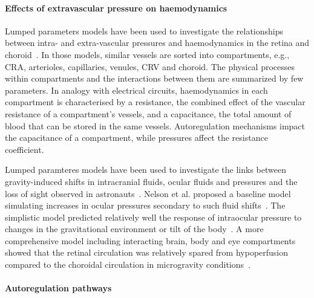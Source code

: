 \documentclass{article}
\begin{document}
\paragraph*{Effects of extravascular pressure on haemodynamics} %

Lumped parameters models have been used to investigate the relationships between intra- and extra-vascular pressures and haemodynamics in the retina and choroid~\cite{Chiaravalli_2021,Fawzi_2019,Guidoboni_2014a,Nelson_2017,Petersen_2022,Prudhomme_2021,Sala_2020,Salerni_2019}.
In those models, similar vessels are sorted into compartments, e.g., CRA, arterioles, capillaries, venules, CRV and choroid.
The physical processes within compartments and the interactions between them are summarized by few parameters.
In analogy with electrical circuits, haemodynamics in each compartment is characterised by a resistance, the combined effect of the vascular resistance of a compartment's vessels, and a capacitance, the total amount of blood that can be stored in the same vessels.
Autoregulation mechanisms impact the capacitance of a compartment, while pressures affect the resistance coefficient.

Lumped paramteres models have been used to investigate the links between gravity-induced shifts in intracranial fluids, ocular fluids and pressures and the loss of sight observed in astronauts~\cite{Nelson_2017,Petersen_2022,Salerni_2019}.
Nelson et al. proposed a baseline model simulating increases in ocular pressures secondary to such fluid shifts~\cite{Nelson_2017}.
The simplistic model predicted relatively well the response of intraocular pressure to changes in the gravitational environment or tilt of the body~\cite{Nelson_2017,Petersen_2022}.
A more comprehensive model including interacting brain, body and eye compartments showed that the retinal circulation was relatively spared from hypoperfusion compared to the choroidal circulation in microgravity conditions~\cite{Salerni_2019}.


\paragraph*{Autoregulation pathways}
\end{document}

